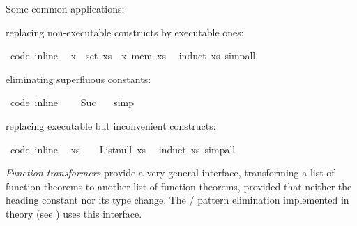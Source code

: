 \begin{isabellebody}
\begin{isamarkuptext}
  Some common applications:%
\end{isamarkuptext}%
\isamarkuptrue%
%
\begin{itemize}
%
\begin{isamarkuptext}%
\item replacing non-executable constructs by executable ones:%
\end{isamarkuptext}%
\isamarkuptrue%
%
\isadelimquote
%
\endisadelimquote
%
\isatagquote
{}\isamarkupfalse%
\ {\isacharbrackleft}code\ inline{\isacharbrackright}{\isacharcolon}\isanewline
\ \ {\isachardoublequoteopen}x\ {\isasymin}\ set\ xs\ {\isasymlongleftrightarrow}\ x\ mem\ xs{\isachardoublequoteclose}\ \isamarkupfalse%
\ {\isacharparenleft}induct\ xs{\isacharparenright}\ simp{\isacharunderscore}all%
\endisatagquote
{\isafoldquote}%
%
\isadelimquote
%
\endisadelimquote
%
\begin{isamarkuptext}%
\item eliminating superfluous constants:%
\end{isamarkuptext}%
\isamarkuptrue%
%
\isadelimquote
%
\endisadelimquote
%
\isatagquote
{}\isamarkupfalse%
\ {\isacharbrackleft}code\ inline{\isacharbrackright}{\isacharcolon}\isanewline
\ \ {\isachardoublequoteopen}{}\ {\isacharequal}\ Suc\ {}{\isachardoublequoteclose}\ \isamarkupfalse%
\ simp%
\endisatagquote
{\isafoldquote}%
%
\isadelimquote
%
\endisadelimquote
%
\begin{isamarkuptext}%
\item replacing executable but inconvenient constructs:%
\end{isamarkuptext}%
\isamarkuptrue%
%
\isadelimquote
%
\endisadelimquote
%
\isatagquote
{}\isamarkupfalse%
\ {\isacharbrackleft}code\ inline{\isacharbrackright}{\isacharcolon}\isanewline
\ \ {\isachardoublequoteopen}xs\ {\isacharequal}\ {\isacharbrackleft}{\isacharbrackright}\ {\isasymlongleftrightarrow}\ List{\isachardot}null\ xs{\isachardoublequoteclose}\ \isamarkupfalse%
\ {\isacharparenleft}induct\ xs{\isacharparenright}\ simp{\isacharunderscore}all%
\endisatagquote
{\isafoldquote}%
%
\isadelimquote
%
\endisadelimquote
%
\end{itemize}
%
\begin{isamarkuptext}%
\noindent \emph{Function transformers} provide a very general interface,
  transforming a list of function theorems to another
  list of function theorems, provided that neither the heading
  constant nor its type change.  The  / 
  pattern elimination implemented in
  theory  (see ) uses this
  interface.


\end{isamarkuptext}
\end{isabellebody}
